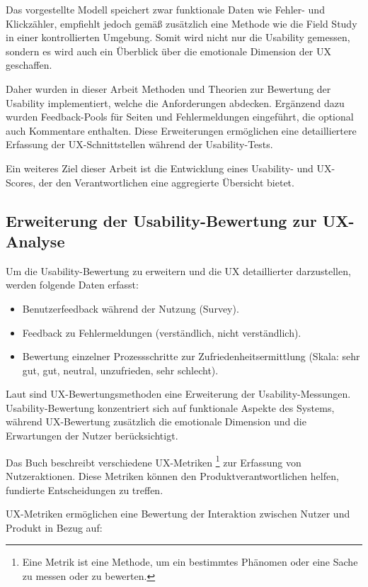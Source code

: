 \documentclass[12pt,oneside]{article}
\begin{document}
Das vorgestellte Modell speichert zwar funktionale Daten wie Fehler- und Klickzähler, empfiehlt jedoch gemäß \cite{Virpi} zusätzlich eine Methode wie die Field Study in einer kontrollierten Umgebung. Somit wird nicht nur die Usability gemessen, sondern es wird auch ein Überblick über die emotionale Dimension der UX geschaffen.

Daher wurden in dieser Arbeit Methoden und Theorien zur Bewertung der Usability implementiert, welche die Anforderungen abdecken. Ergänzend dazu wurden Feedback-Pools für Seiten und Fehlermeldungen eingeführt, die optional auch Kommentare enthalten. Diese Erweiterungen ermöglichen eine detailliertere Erfassung der UX-Schnittstellen während der Usability-Tests.

Ein weiteres Ziel dieser Arbeit ist die Entwicklung eines Usability- und UX-Scores, der den Verantwortlichen eine aggregierte Übersicht bietet.

\subsection{Erweiterung der Usability-Bewertung zur UX-Analyse}

Um die Usability-Bewertung zu erweitern und die UX detaillierter darzustellen, werden folgende Daten erfasst:

\begin{itemize} \item Benutzerfeedback während der Nutzung (Survey). \item Feedback zu Fehlermeldungen (verständlich, nicht verständlich). \item Bewertung einzelner Prozessschritte zur Zufriedenheitsermittlung (Skala: sehr gut, gut, neutral, unzufrieden, sehr schlecht). \end{itemize}

Laut \cite{GOISTAI} sind UX-Bewertungsmethoden eine Erweiterung der Usability-Messungen. Usability-Bewertung konzentriert sich auf funktionale Aspekte des Systems, während UX-Bewertung zusätzlich die emotionale Dimension und die Erwartungen der Nutzer berücksichtigt.

Das Buch \cite{measuring} beschreibt verschiedene UX-Metriken \footnote{Eine Metrik ist eine Methode, um ein bestimmtes Phänomen oder eine Sache zu messen oder zu bewerten.} zur Erfassung von Nutzeraktionen. Diese Metriken können den Produktverantwortlichen helfen, fundierte Entscheidungen zu treffen.

UX-Metriken ermöglichen eine Bewertung der Interaktion zwischen Nutzer und Produkt in Bezug auf:
\end{document}
